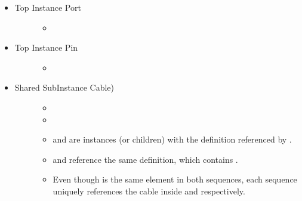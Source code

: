 \documentclass[letterpaper,10pt,english,openany,oneside]{sphinxmanual}
\begin{document}
\begin{fulllineitems}
\begin{itemize}
\item {} \begin{description}
\item[{Top Instance Port}] \leavevmode\begin{itemize}
\item {} 

\end{itemize}

\end{description}

\item {} \begin{description}
\item[{Top Instance Pin}] \leavevmode\begin{itemize}
\item {} 

\end{itemize}

\end{description}

\item {} \begin{description}
\item[{Shared Sub\sphinxhyphen{}Instance Cable)}] \leavevmode\begin{itemize}
\item {} 

\item {} 

\item {} 
 and  are instances (or children) with the definition referenced by
.

\item {} 
 and  reference the same definition, which contains .

\item {} 
Even though  is the same element in both sequences, each sequence uniquely references the cable
inside  and  respectively.


\end{itemize}
\end{description}
\end{itemize}
\end{fulllineitems}
\end{document}

